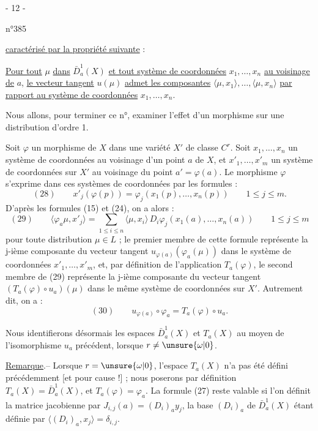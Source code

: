 \begin{center}- 12 -\end{center}
\begin{flushright}n°385\end{flushright}
\uline{caractérisé par la propriété suivante} :

\uline{Pour tout} $\mu$ \uline{dans} $\bar D_a^1(X)$ \uline{et tout système de coordonnées} $x_1,\ldots,x_n$ \uline{au voisinage de} $a$, \uline{le vecteur tangent} $u(\mu)$ \uline{admet les composantes} $\langle\mu,x_1\rangle,\ldots,\langle\mu,x_n\rangle$ \uline{par rapport au système de coordonnées} $x_1,\ldots,x_n$.

Nous allons, pour terminer ce n°, examiner l'effet d'un morphisme sur une distribution d'ordre 1.

Soit $\varphi$ un morphisme de $X$ dans une variété $X'$ de classe $C^r$. Soit $x_1,\ldots,x_n$ un système de coordonnées au voisinage d'un point $a$ de $X$, et $x'_1,\ldots,x'_m$ un système de coordonnées sur $X'$ au voisinage du point $a'=\varphi(a)$. Le morphisme $\varphi$ s'exprime dans ces systèmes de coordonnées par les formules :
\[
(28)\qquad x'_j(\varphi(p))=\varphi_j(x_1(p),\ldots,x_n(p))
\qquad 1\leq j\leq m.
\]
D'après les formules (15) et (24), on a alors :
\[
(29)\qquad
\langle\varphi_a\mu,x'_j\rangle
=\sum_{1\leq i\leq n}\langle\mu,x_i\rangle\,D_i\varphi_j(x_1(a),\ldots,x_n(a))
\qquad 1\leq j\leq m
\]
pour toute distribution $\mu\in L$ ; le premier membre de cette formule représente la j-ième composante du vecteur tangent $u_{\varphi(a)}(\varphi_a(\mu))$ dans le système de coordonnées $x'_1,\ldots,x'_m$, et, par définition de l'application $T_a(\varphi)$, le second membre de (29) représente la j-ième composante du vecteur tangent $(T_a(\varphi)\circ u_a)(\mu)$ dans le même système de coordonnées sur $X'$. Autrement dit, on a :
\[
(30)\qquad u_{\varphi(a)}\circ\varphi_a=T_a(\varphi)\circ u_a.
\]

Nous identifierons désormais les espaces $\bar D_a^1(X)$ et $T_a(X)$ au moyen de l'isomorphisme $u_a$ précédent, lorsque $r\neq\unsure{\omega|0}$.

\uline{Remarque}.-- Lorsque $r=\unsure{\omega|0}$, l'espace $T_a(X)$ n'a pas été défini précédemment [et pour cause !] ; nous poserons par définition $T_a(X)=\bar D_a^1(X)$, et $T_a(\varphi)=\varphi_a$. La formule (27) reste valable si l'on définit la matrice jacobienne par $J_{i,j}(a)=(D_i)_a y_j$, la base $(D_i)_a$ de $\bar D_a^1(X)$ étant définie par $\langle(D_i)_a,x_j\rangle=\delta_{i,j}$.

